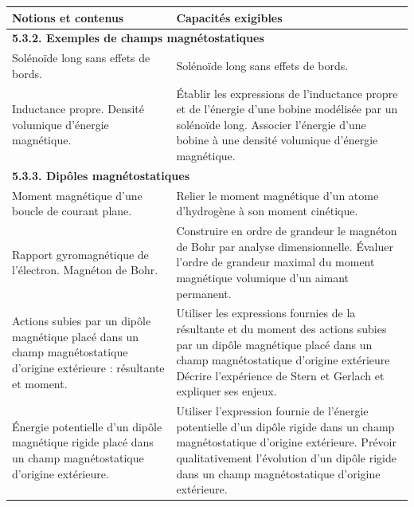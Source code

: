 {\scriptsize
\begin{flushleft}
\end{flushleft}

        \begin{tabularx}{\linewidth}{|p{}|X|}
            \hline 
            \textbf{Notions et contenus} & \textbf{Capacités exigibles} \\
            \hline 
            \multicolumn{2}{|l|}{\textbf{5.3.2. Exemples de champs magnétostatiques }} \\
            \hline 
            Solénoïde long sans effets de bords. &  Solénoïde long sans effets de bords. \\ 
            \hline
            Inductance propre. Densité volumique d'énergie magnétique. & Établir les expressions de l'inductance propre et de l'énergie d'une bobine modélisée par un solénoïde long. Associer l'énergie d'une bobine à une densité volumique d'énergie magnétique. \\
            \multicolumn{2}{|l|}{\textbf{5.3.3. Dipôles magnétostatiques}} \\
            \hline 
            Moment magnétique d'une boucle de courant plane.  & 
            Relier le moment magnétique d'un atome d'hydrogène à son moment cinétique. \\
            \hline 
            Rapport gyromagnétique de l'électron. Magnéton de Bohr.  & Construire en ordre de grandeur le magnéton de Bohr par analyse dimensionnelle.
            Évaluer l'ordre de grandeur maximal du moment magnétique volumique d'un aimant permanent.  \\
            \hline 
            Actions subies par un dipôle magnétique placé dans un champ magnétostatique d'origine extérieure : résultante et moment. & Utiliser les expressions fournies de la résultante et du moment des actions subies par un dipôle magnétique placé dans un champ magnétostatique d'origine extérieure Décrire l'expérience de Stern et Gerlach et expliquer ses enjeux. \\
            \hline
            Énergie potentielle d'un dipôle magnétique rigide placé dans un champ magnétostatique d'origine extérieure.  & Utiliser l'expression fournie de l'énergie potentielle d'un dipôle rigide dans un champ magnétostatique d'origine extérieure.
            Prévoir qualitativement l'évolution d'un dipôle rigide dans un champ magnétostatique d'origine extérieure. \\
        \hline 
        \end{tabularx}
\vspace{0.5cm}
}

